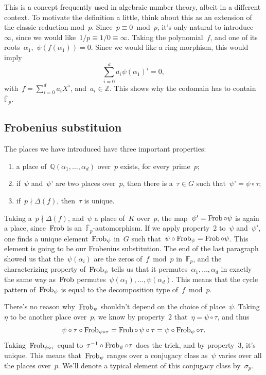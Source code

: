 This is a concept frequently used in algebraic number theory, albeit in a different context. To motivate the definition a little, think about this as an extension of the classic reduction mod~$p$. Since~$p \equiv 0\bmod p$, it's only natural to introduce~$\infty$, since we would like~$1/p \equiv 1/0 \equiv \infty$. Taking the polynomial~$f$, and one of its roots~$\alpha_{1}$,~$\psi(f(\alpha_{1}))=0$. Since we would like a ring morphism, this would imply~$$\sum_{i=0}^{d} \overline{a_{i}} \psi(\alpha_{1})^{i}=0,$$ with~$f=\sum_{i=0}^{d} a_{i}X^{i}$, and~$a_{i} \in \mathbb{Z}$. This shows why the codomain has to contain~$\overline{\mathbb{F}}_{p}$.

\subsection{Frobenius substituion}

The places we have introduced have three important properties:
\begin{enumerate}
  \item a place of~$\mathbb{Q}(\alpha_{1},\ldots,\alpha_{d})$ over~$p$ exists, for every prime~$p$;
	\item if~$\psi$ and~$\psi’$ are two places over~$p$, then there is a~$\tau \in G$ such that~$\psi’=\psi \circ \tau$;
	\item if~$p \nmid \Delta(f)$, then~$\tau$ is unique.
\end{enumerate}
Taking a~$p \nmid \Delta(f)$, and~$\psi$ a place of~$K$ over~$p$, the map~$\psi'=\operatorname{Frob} \circ \psi$ is again a place, since~$\operatorname{Frob}$ is an~$\overline{\mathbb{F}}_{p}$-automorphism. If we apply property~$2$ to~$\psi$ and~$\psi'$, one finds a unique element~$\operatorname{Frob}_{\psi}$ in~$G$ such that~$\psi \circ \operatorname{Frob}_{\psi} = \operatorname{Frob} \circ \psi$. This element is going to be our Frobenius substitution. The end of the last paragraph showed us that the~$\psi(\alpha_{i})$ are the zeros of~$f\bmod p$ in~$\overline{\mathbb{F}}_{p}$, and the characterizing property of~$\operatorname{Frob}_{\psi}$ tells us that it permutes~$\alpha_{1},\ldots,\alpha_{d}$ in exactly the same way as~$\operatorname{Frob}$ permutes~$\psi(\alpha_{1}),\ldots,\psi(\alpha_{d})$. This means that the cycle pattern of~$\operatorname{Frob}_{\psi}$ is equal to the decomposition type of~$f\bmod p$.

There's no reason why~$\operatorname{Frob}_{\psi}$ shouldn't depend on the choice of place~$\psi$. Taking~$\eta$ to be another place over~$p$, we know by property~$2$ that~$\eta=\psi \circ \tau$, and thus
\begin{equation}
  \psi \circ \tau \circ \operatorname{Frob}_{\psi \circ \tau}=\operatorname{Frob} \circ\, \psi \circ \tau=\psi \circ \operatorname{Frob}_{\psi} \circ \tau. 
\end{equation}
Taking~$\operatorname{Frob}_{\psi \circ \tau}$ equal to~$\tau^{-1} \circ \operatorname{Frob}_{\psi} \circ \tau$ does the trick, and by property~$3$, it's unique. This means that~$\operatorname{Frob}_{\psi}$ ranges over a conjugacy class as~$\psi$ varies over all the places over~$p$. We'll denote a typical element of this conjugacy class by~$\sigma_{p}$.


